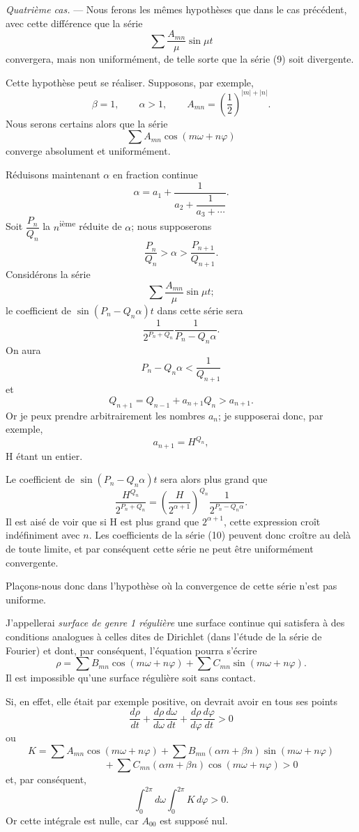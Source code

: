 \documentclass[11pt]{article}
\begin{document}
\emph{Quatrième cas.} — Nous ferons les mêmes hypothèses que dans le cas précédent, avec cette différence que la série
\[
\sum \frac{A_{mn}}{\mu}\sin\mu t
\]
convergera, mais non uniformément, de telle sorte que la série (9) soit divergente.

Cette hypothèse peut se réaliser. Supposons, par exemple,
\[
\beta=1,
\qquad
\alpha>1,
\qquad
A_{mn}=\left(\frac12\right)^{|m|+|n|}.
\]
Nous serons certains alors que la série
\[
\sum A_{mn}\cos(m\omega+n\varphi)
\]
converge absolument et uniformément.

Réduisons maintenant $\alpha$ en fraction continue
\[
\alpha=a_1+\frac1{a_2+\dfrac1{a_3+\cdots}}.
\]
Soit $\dfrac{P_n}{Q_n}$ la $n$\textsuperscript{ième} réduite de $\alpha$; nous supposerons
\[
\frac{P_n}{Q_n}>\alpha>\frac{P_{n+1}}{Q_{n+1}}.
\]
Considérons la série
\begin{equation}
\sum \frac{A_{mn}}{\mu}\sin\mu t;
\tag{10}
\end{equation}
le coefficient de $\sin(P_n-Q_n\alpha)t$ dans cette série sera
\[
\frac1{2^{P_n+Q_n}}\frac1{P_n-Q_n\alpha}.
\]
On aura
\[
P_n-Q_n\alpha<\frac1{Q_{n+1}}
\]
et
\[
Q_{n+1}=Q_{n-1}+a_{n+1}Q_n>a_{n+1}.
\]
Or je peux prendre arbitrairement les nombres $a_n$; je supposerai donc, par exemple,
\[
a_{n+1}=H^{Q_n},
\]
H étant un entier.

Le coefficient de $\sin(P_n-Q_n\alpha)t$ sera alors plus grand que
\[
\frac{H^{Q_n}}{2^{P_n+Q_n}}=\left(\frac{H}{2^{\alpha+1}}\right)^{Q_n}\frac1{2^{P_n-Q_n\alpha}}.
\]
Il est aisé de voir que si H est plus grand que $2^{\alpha+1}$, cette expression croît indéfiniment avec $n$. Les coefficients de la série (10) peuvent donc croître au delà de toute limite, et par conséquent cette série ne peut être uniformément convergente.

Plaçons-nous donc dans l’hypothèse où la convergence de cette série n’est pas uniforme.

J’appellerai \emph{surface de genre 1 régulière} une surface continue qui satisfera à des conditions analogues à celles dites de Dirichlet (dans l’étude de la série de Fourier) et dont, par conséquent, l’équation pourra s’écrire
\[
\rho=\sum B_{mn}\cos(m\omega+n\varphi)+\sum C_{mn}\sin(m\omega+n\varphi).
\]
Il est impossible qu’une surface régulière soit sans contact.

Si, en effet, elle était par exemple positive, on devrait avoir en tous ses points
\[
\frac{d\rho}{dt}+\frac{d\rho}{d\omega}\frac{d\omega}{dt}+\frac{d\rho}{d\varphi}\frac{d\varphi}{dt}>0
\]
ou
\[
K=\sum A_{mn}\cos(m\omega+n\varphi)+\sum B_{mn}(\alpha m+\beta n)\sin(m\omega+n\varphi)
\]
\[
\hspace{4em}+\sum C_{mn}(\alpha m+\beta n)\cos(m\omega+n\varphi)>0
\]
et, par conséquent,
\[
\int_0^{2\pi}d\omega\int_0^{2\pi}K\,d\varphi>0.
\]
Or cette intégrale est nulle, car $A_{00}$ est supposé nul.
\end{document}
